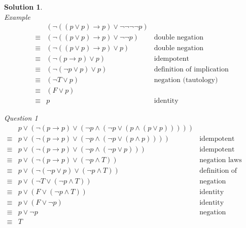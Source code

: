 \documentclass{article}
\theoremstyle{definition}
\newtheorem*{solution}{Solution}
\begin{document}
\begin{solution}\ \\
\textit{Example}
\begin{align*}
 & (\neg ((p \vee p) \to p) \vee \neg \neg \neg \neg p) & \\
\equiv & (\neg ((p \vee p) \to p) \vee \neg \neg p) & \text{double negation}\\
\equiv & (\neg ((p \vee p) \to p) \vee p) & \text{double negation}\\
\equiv & (\neg (p \to p) \vee p) & \text{idempotent}\\
\equiv & (\neg (\neg p \vee p) \vee p) & \text{definition of implication}\\
\equiv & (\neg T \vee p) & \text{negation (tautology)}\\
\equiv & (F \vee p) &\\
\equiv & p & \text{identity}
\end{align*}

\textit{Question 1}
\begin{align*}
 & p \vee (\neg (p \to p) \vee (\neg p \wedge (\neg p \vee (p \wedge (p \vee p))))) \\
 \equiv & p \vee (\neg (p \to p) \vee (\neg p \wedge (\neg p \vee (p \wedge p)))) & \text{idempotent} \\
 \equiv & p \vee (\neg (p \to p) \vee (\neg p \wedge (\neg p \vee p))) & \text {idempotent} \\
 \equiv & p \vee (\neg (p \to p) \vee (\neg p \wedge T)) & \text{negation laws} \\
 \equiv & p \vee (\neg (\neg p \vee p) \vee (\neg p \wedge T)) & \text{definition of implication} \\
 \equiv & p \vee (\neg T \vee (\neg p \wedge T))  & \text {negation} \\
 \equiv & p \vee (F \vee (\neg p \wedge T))  & \text {identity} \\ 
 \equiv & p \vee (F \vee \neg p)  & \text {identity} \\ 
 \equiv & p \vee  \neg p  & \text {negation} \\ 
 \equiv & T \\ 
 \end{align*}
 

\end{solution}
\end{document}
